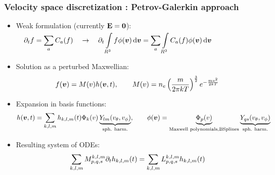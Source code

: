 \documentclass[mathserif, aspectratio=169]{beamer}
\newcommand{\ud}{\,\mathrm{d}}
\newcommand{\vect}[1]{\boldsymbol{#1}}
\newcommand{\of}[1]{\mleft( #1 \mright)}
\newcommand{\vth}{v_{\textrm{th}}}
\newcommand{\myint}[2]{\int\limits_{#1}^{#2}}
\begin{document}
	\begin{frame}
		\frametitle{Velocity space discretization : Petrov-Galerkin approach}
		\begin{itemize}

		\item Weak formulation (currently $\bf E=0$):
		$
		\displaystyle
		\quad
		\partial_t f = \sum_{a} C_a(f)
		\quad \rightarrow \quad
		\partial_t \myint{R^3}{} f \phi\of{\vect{v}} \ud \vect{v} = \sum_{a}
		\myint{R^3}{} C_a(f) \phi\of{\vect{v}} \ud \vect{v}
		$

		\item Solution as a perturbed Maxwellian:
		\begin{align*}
		f\of{\vect{v}} = M\of{v} h\of{\vect{v},t}
		, \quad\quad
		M\of{v} = n_e \left( \frac{m}{2 \pi kT }\right)^{\frac32} e^{-\frac{mv^2}{2kT}}
		\end{align*}

		\item Expansion in basis functions:
		\begin{align*}
		h\of{\vect{v},t} =
		\sum_{k,l,m} h_{k,l,m} \of{t} \Phi_k\of{v} \underbrace{Y_{lm}\of{v_\theta, v_\phi}}_{\tiny\text{sph. harm.}},
		\quad
		\quad
		\phi\of{\vect{v}} = \underbrace{\Phi_p\of{v}}_{\tiny\text{Maxwell polynomials,BSplines}} \underbrace{Y_{qs}\of{v_\theta, v_\phi}}_{\tiny\text{sph. harm.}}
		\end{align*}

		\item Resulting system of ODEs:
		\begin{align*}
		\sum_{k,l,m} M_{p,q,s}^{k,l,m} \partial_t h_{k,l,m}\of{t} = \sum_{k,l,m}  L_{p,q,s}^{k,l,m} h_{k,l,m}\of{t}
		\end{align*}
		\end{itemize}
	\end{frame}
\end{document}
